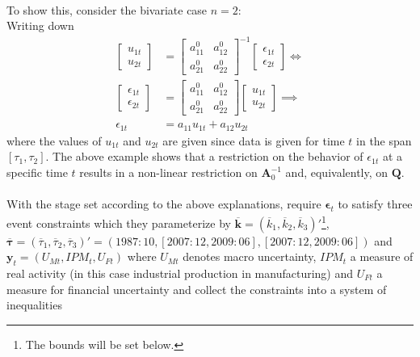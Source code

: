 \documentclass[a4paper,11pt,listof=nochaptergap,oneside,pointednumbers,bibtotoc,bigheadings,liststotoc]{scrbook}
\theoremstyle{mysatz}
\theoremstyle{mydefinition}
\theoremstyle{mytheorem}
\theoremstyle{mybemerkung}
\newcommand{\vect}[1]{\boldsymbol{\mathbf{#1}}}
\begin{document}
\\
To show this, \citet{ludvigsonetal:18} consider the bivariate case $n=2$:\\
Writing down
\begin{equation} \label{eq:svar_ludvi11}
\begin{split}
	\begin{bmatrix}
    		u_{1t} \\
		u_{2t}
 		\end{bmatrix} & = 
		\begin{bmatrix}
    			a_{11}^0 &  a_{12}^0 \\
			a_{21}^0 &  a_{22}^0
 			\end{bmatrix}^{-1}
			\begin{bmatrix}
    				\epsilon_{1t} \\
				\epsilon_{2t}
 				\end{bmatrix}  \iff \\
	\begin{bmatrix}
    		\epsilon_{1t} \\
		\epsilon_{2t}
 		\end{bmatrix} & = 
		\begin{bmatrix}
    			a_{11}^0 &  a_{12}^0 \\
			a_{21}^0 &  a_{22}^0
 			\end{bmatrix}
			\begin{bmatrix}
    				u_{1t} \\
				u_{2t}
 				\end{bmatrix} \implies \\
				\epsilon_{1t} & = a_{11}u_{1t} + a_{12}u_{2t}
\end{split}								
\end{equation}
where the values of $u_{1t}$ and $u_{2t}$ are given since data is given for time $t$ in the span $[\tau_1, \tau_2]$. The above example shows that a restriction on the behavior of $\epsilon_{1t}$ at a specific time $t$ results in a non-linear restriction on $\vect{A}_0^{-1}$ and, equivalently, on $\vect{Q}$.
\\
\\
With the stage set according to the above explanations, \citet{ludvigsonetal:18} require $\vect{\epsilon}_t$ to satisfy three event constraints which they parameterize by $\overline{\vect{k}} = (\overline{k}_1, \overline{k}_2, \overline{k}_3)'$\footnote{The bounds will be set below.}, $\overline{\vect{\tau}} = (\overline{\tau}_1, \overline{\tau}_2, \overline{\tau}_3)' = (1987:10, [2007:12, 2009:06], [2007:12, 2009:06])$ and $\vect{y}_t = (U_{Mt}, IPM_{t}, U_{Ft})$ where $U_{Mt}$ denotes macro uncertainty, $IPM_{t}$ a measure of real activity (in this case industrial production in manufacturing) and $U_{Ft}$ a measure for financial uncertainty and collect the constraints into a system of inequalities
\end{document}
